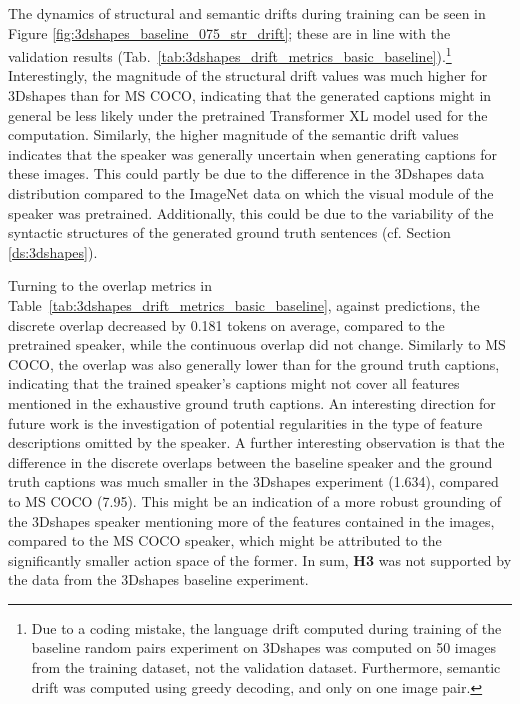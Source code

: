 The dynamics of structural and semantic drifts during training can be seen in Figure \ref{fig:3dshapes_baseline_075_str_drift}; these are in line with the validation results (Tab.~\ref{tab:3dshapes_drift_metrics_basic_baseline}).\footnote{Due to a coding mistake, the language drift computed during training of the baseline random pairs experiment on 3Dshapes was computed on 50 images from the training dataset, not the validation dataset. Furthermore, semantic drift was computed using greedy decoding, and only on one image pair.} 
Interestingly, the magnitude of the structural drift values was much higher for 3Dshapes than for MS COCO, indicating that the generated captions might in general be less likely under the pretrained Transformer XL model used for the computation. Similarly, the higher magnitude of the semantic drift values indicates that the speaker was generally uncertain when generating captions for these images. This could partly be due to the difference in the 3Dshapes data distribution compared to the ImageNet data on which the visual module of the speaker was pretrained. Additionally, this could be due to the variability of the syntactic structures of the generated ground truth sentences (cf. Section \ref{ds:3dshapes}). 

Turning to the overlap metrics in Table~\ref{tab:3dshapes_drift_metrics_basic_baseline}, against predictions, the discrete overlap decreased by 0.181 tokens on average, compared to the pretrained speaker, while the continuous overlap did not change. Similarly to MS COCO, the overlap was also generally lower than for the ground truth captions, indicating that the trained speaker's captions might not cover all features mentioned in the exhaustive ground truth captions. An interesting direction for future work is the investigation of potential regularities in the type of feature descriptions omitted by the speaker. A further interesting observation is that the difference in the discrete overlaps between the baseline speaker and the ground truth captions was much smaller in the 3Dshapes experiment (1.634), compared to MS COCO (7.95). This might be an indication of a more robust grounding of the 3Dshapes speaker mentioning more of the features contained in the images, compared to the MS COCO speaker, which might be attributed to the significantly smaller action space of the former. In sum, \textbf{H3} was not supported by the data from the 3Dshapes baseline experiment.



